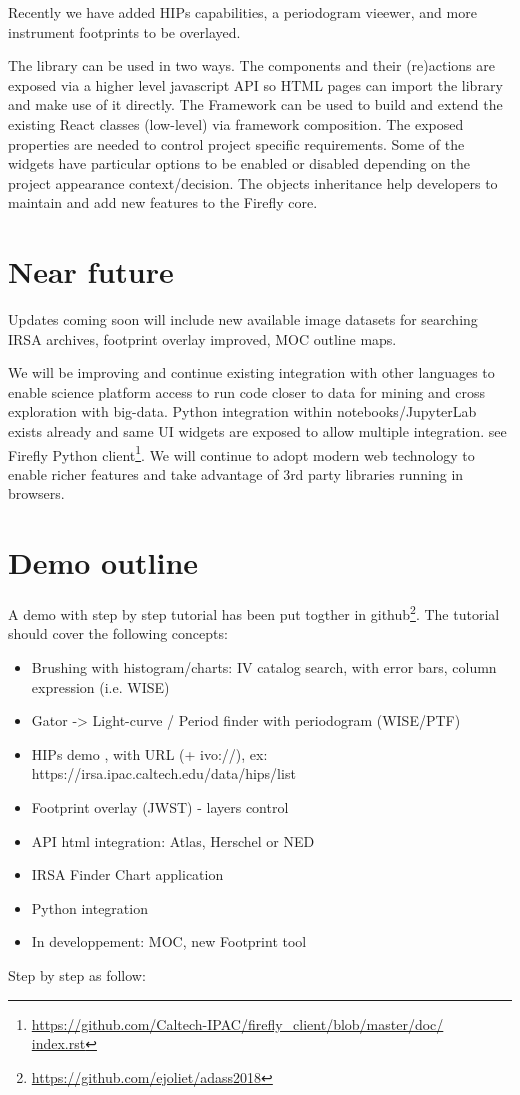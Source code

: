 \documentclass[11pt,twoside]{article}
\begin{document}
Recently we have added HIPs capabilities, a periodogram vieewer, and more instrument footprints to be overlayed.

The library can be used in two ways. The components and their (re)actions are exposed via a higher level javascript API so HTML pages can import the library and make use of it directly.
The Framework can be used to build and extend the existing React classes (low-level) via framework composition. The exposed properties are needed to control project specific requirements. Some of the widgets have particular options to be enabled or disabled depending on the project appearance context/decision. The objects inheritance help developers to maintain and add new features to the Firefly core.


\section{Near future}

Updates coming soon will include new available image datasets for searching IRSA archives, footprint overlay improved, MOC outline maps.

We will be improving and continue existing integration with other languages to enable science platform access to run code closer to data for mining and cross exploration with big-data.
Python integration within notebooks/JupyterLab exists already and same UI widgets are exposed to allow multiple integration. see Firefly Python client\footnote{\url{https://github.com/Caltech-IPAC/firefly_client/blob/master/doc/ index.rst}}.
We will continue to adopt modern web technology to enable richer features and take advantage of 3rd party libraries running in browsers.



\section{Demo outline}

A demo with step by step tutorial has been put togther in github\footnote{\url{https://github.com/ejoliet/adass2018}}.
The tutorial should cover the following concepts:

\begin{itemize}
  \item Brushing with histogram/charts: IV catalog search, with error bars, column expression (i.e. WISE)
  \item Gator -> Light-curve / Period finder with periodogram (WISE/PTF)
  \item HIPs demo , with URL (+ ivo://), ex: https://irsa.ipac.caltech.edu/data/hips/list
  \item Footprint overlay (JWST) - layers control
  \item API html integration: Atlas, Herschel or NED
  \item IRSA Finder Chart application
  \item Python integration
  \item In developpement: MOC, new Footprint tool
\end{itemize}
\smallskip
Step by step as follow:
\end{document}
